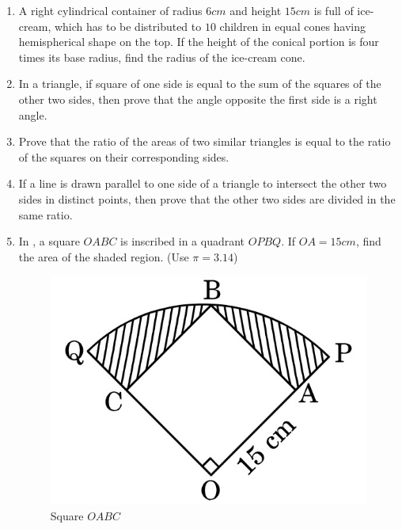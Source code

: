 \begin{enumerate}
\item A right cylindrical container of radius $6 cm$ and height $15 cm$ is full of ice-cream, which has to be distributed to $10$ children in equal cones having hemispherical shape on the top. If the height of the conical portion is four times its base radius, find the radius of the ice-cream cone.

\item In a triangle, if square of one side is equal to the sum of the squares of the other two sides, then prove that the angle opposite the first side is a right angle.

\item Prove that the ratio of the areas of two similar triangles is equal to the ratio of the squares on their corresponding sides.

\item If a line is drawn parallel to one side of a triangle to intersect the  other two sides in distinct points, then prove that the other two sides are divided in the same ratio.



\item In  , a square $OABC$ is inscribed in a quadrant $OPBQ$. If $OA = 15 cm$, find the area of the shaded region. (Use $\pi = 3.14$)
\begin{figure}[H]
    \centering
    \includegraphics[width=\columnwidth]{figs/img4.jpg}
    \caption{Square $OABC$}
    \label{fig:Figh_4}
\end{figure}


\end{enumerate}
